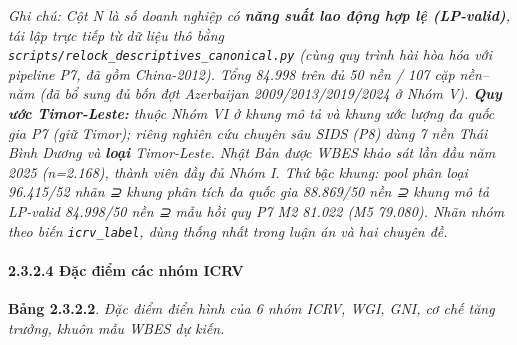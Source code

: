 \documentclass[
  a4paper,
  13pt]{extreport}
\begin{document}
\emph{Ghi chú: Cột N là số doanh nghiệp có \textbf{năng suất lao động
hợp lệ (LP-valid)}, tái lập trực tiếp từ dữ liệu thô bằng
\texttt{scripts/relock\_descriptives\_canonical.py} (cùng quy trình hài
hòa hóa với pipeline P7, đã gồm China-2012). Tổng 84.998 trên đủ 50 nền
/ 107 cặp nền--năm (đã bổ sung đủ bốn đợt Azerbaijan 2009/2013/2019/2024
ở Nhóm V). \textbf{Quy ước Timor-Leste:} thuộc Nhóm VI ở khung mô tả và
khung ước lượng đa quốc gia P7 (giữ Timor); riêng nghiên cứu chuyên sâu
SIDS (P8) dùng 7 nền Thái Bình Dương và \textbf{loại} Timor-Leste. Nhật
Bản được WBES khảo sát lần đầu năm 2025 (n=2.168), thành viên đầy đủ
Nhóm I. Thứ bậc khung: pool phân loại 96.415/52 nhãn ⊇ khung phân tích
đa quốc gia 88.869/50 nền ⊇ khung mô tả LP-valid 84.998/50 nền ⊇ mẫu hồi
quy P7 M2 81.022 (M5 79.080). Nhãn nhóm theo biến \texttt{icrv\_label},
dùng thống nhất trong luận án và hai chuyên đề.}

\hypertarget{ux111ux1eb7c-ux111iux1ec3m-cuxe1c-nhuxf3m-icrv}{%
\paragraph{2.3.2.4 Đặc điểm các nhóm
ICRV}\label{ux111ux1eb7c-ux111iux1ec3m-cuxe1c-nhuxf3m-icrv}}

\textbf{Bảng 2.3.2.2}. \emph{Đặc điểm điển hình của 6 nhóm ICRV, WGI,
GNI, cơ chế tăng trưởng, khuôn mẫu WBES dự kiến.}
\end{document}
